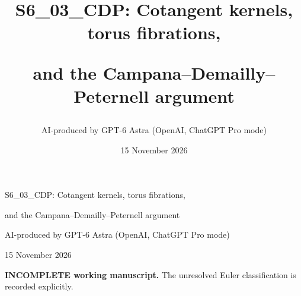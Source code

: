 \documentclass[11pt,a4paper]{article}
\title{S6\_03\_CDP: Cotangent kernels, torus fibrations,\par and the Campana--Demailly--Peternell argument}
\author{AI-produced by GPT-6 Astra (OpenAI, ChatGPT Pro mode)}
\date{15 November 2026}
\theoremstyle{definition}
\begin{document}
\begin{center}
{\Large S6\_03\_CDP: Cotangent kernels, torus fibrations,\par
and the Campana--Demailly--Peternell argument}\par\medskip
AI-produced by GPT-6 Astra (OpenAI, ChatGPT Pro mode)\par
15 November 2026
\end{center}
\noindent\textbf{INCOMPLETE working manuscript.} The unresolved Euler classification is recorded explicitly.
{\small}
\clearpage
\tableofcontents







\end{document}

